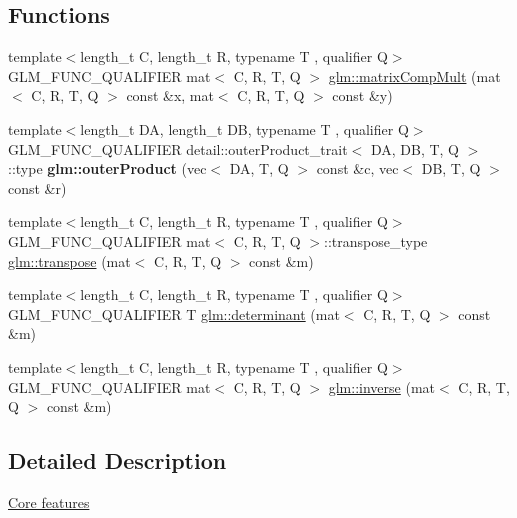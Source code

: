 \subsection*{Functions}
\begin{DoxyCompactItemize}
\item 
{\footnotesize template$<$length\+\_\+t C, length\+\_\+t R, typename T , qualifier Q$>$ }\\G\+L\+M\+\_\+\+F\+U\+N\+C\+\_\+\+Q\+U\+A\+L\+I\+F\+I\+ER mat$<$ C, R, T, Q $>$ \hyperlink{group__core__func__matrix_gaf14569404c779fedca98d0b9b8e58c1f}{glm\+::matrix\+Comp\+Mult} (mat$<$ C, R, T, Q $>$ const \&x, mat$<$ C, R, T, Q $>$ const \&y)
\item 
\mbox{\label{func__matrix_8inl_a0f636d2e7ae0bfb8afe265b73f91f52c}} 
{\footnotesize template$<$length\+\_\+t DA, length\+\_\+t DB, typename T , qualifier Q$>$ }\\G\+L\+M\+\_\+\+F\+U\+N\+C\+\_\+\+Q\+U\+A\+L\+I\+F\+I\+ER detail\+::outer\+Product\+\_\+trait$<$ DA, DB, T, Q $>$\+::type {\bfseries glm\+::outer\+Product} (vec$<$ DA, T, Q $>$ const \&c, vec$<$ DB, T, Q $>$ const \&r)
\item 
{\footnotesize template$<$length\+\_\+t C, length\+\_\+t R, typename T , qualifier Q$>$ }\\G\+L\+M\+\_\+\+F\+U\+N\+C\+\_\+\+Q\+U\+A\+L\+I\+F\+I\+ER mat$<$ C, R, T, Q $>$\+::transpose\+\_\+type \hyperlink{group__core__func__matrix_gae679d841da8ce9dbcc6c2d454f15bc35}{glm\+::transpose} (mat$<$ C, R, T, Q $>$ const \&m)
\item 
{\footnotesize template$<$length\+\_\+t C, length\+\_\+t R, typename T , qualifier Q$>$ }\\G\+L\+M\+\_\+\+F\+U\+N\+C\+\_\+\+Q\+U\+A\+L\+I\+F\+I\+ER T \hyperlink{group__core__func__matrix_gad7928795124768e058f99dce270f5c8d}{glm\+::determinant} (mat$<$ C, R, T, Q $>$ const \&m)
\item 
{\footnotesize template$<$length\+\_\+t C, length\+\_\+t R, typename T , qualifier Q$>$ }\\G\+L\+M\+\_\+\+F\+U\+N\+C\+\_\+\+Q\+U\+A\+L\+I\+F\+I\+ER mat$<$ C, R, T, Q $>$ \hyperlink{group__core__func__matrix_gace61e11fc177491beeca0c6971e2f3fc}{glm\+::inverse} (mat$<$ C, R, T, Q $>$ const \&m)
\end{DoxyCompactItemize}


\subsection{Detailed Description}
\hyperlink{group__core}{Core features} 